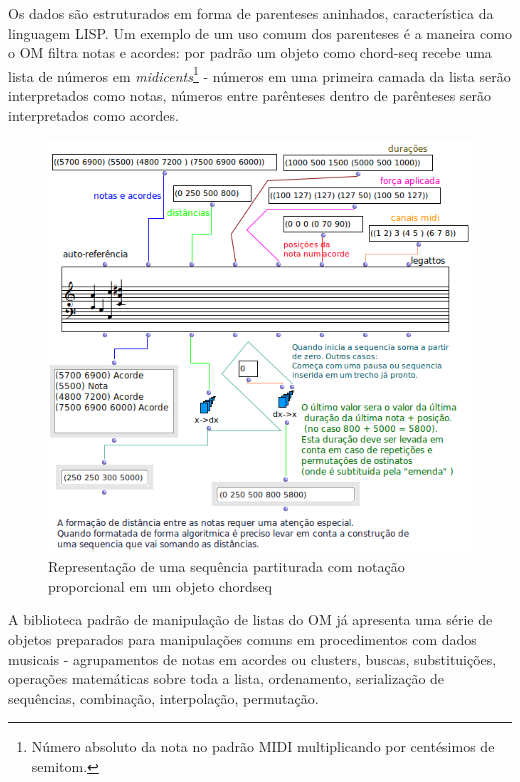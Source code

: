 \documentclass[
	12pt,				%
	openright,			%
	twoside,			%
	a4paper,			%
	english,			%
	french,				%
	spanish,			%
	brazil				%
	]{abntex2}
\begin{document}
Os dados são estruturados em forma de parenteses aninhados, característica da linguagem LISP. Um exemplo de um uso comum dos parenteses é a maneira como o OM filtra notas e acordes: por padrão um objeto como chord-seq recebe uma lista de números em \textit{midicents}\footnote{Número absoluto da nota no padrão MIDI multiplicando por centésimos de semitom.} - números em uma primeira camada da lista serão interpretados como notas, números entre parênteses dentro de parênteses serão interpretados como acordes.


\begin{figure}[!h]
	\caption{\label{fig_grafico}Representação de uma sequência partiturada com notação proporcional em um objeto chord\-seq }
	\begin{center}
	    \includegraphics[scale=0.8]{OMPD/chord-seq-sem-titulo.png}
	\end{center}
\end{figure}

A biblioteca padrão de manipulação de listas do OM já apresenta uma série de objetos preparados para manipulações comuns em procedimentos com dados musicais - agrupamentos de notas em acordes ou clusters, buscas, substituições, operações matemáticas sobre toda a lista, ordenamento, serialização  de sequências, combinação, interpolação, permutação. 
\end{document}
